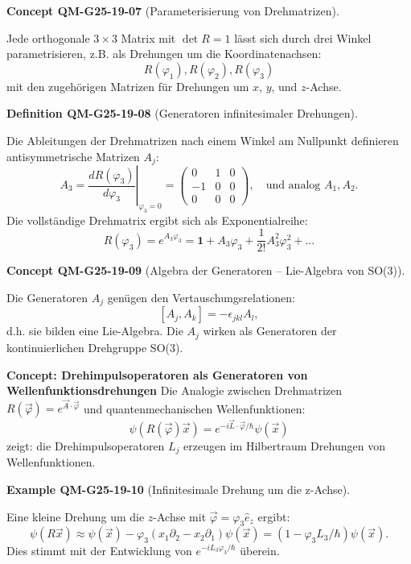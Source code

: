 \documentclass[10pt, letterpaper]{article}
\newcommand{\CustomHeading}[3]{%
  \par\medskip\noindent%
  \textbf{#1 #2} \textnormal{(#3)}.\enskip%
}
\newenvironment{DEF}[2]{\CustomHeading{Definition}{#1}{#2}}{}
\newenvironment{EXA}[2]{\CustomHeading{Example}{#1}{#2}}{}
\newenvironment{CONC}[2]{\CustomHeading{Concept}{#1}{#2}}{}
\begin{document}
\begin{CONC}{QM-G25-19-07}{Parameterisierung von Drehmatrizen}
Jede orthogonale $3\times3$ Matrix mit $\det R = 1$ lässt sich durch drei Winkel parametrisieren, z.B. als Drehungen um die Koordinatenachsen:
$$
R(\varphi_1), R(\varphi_2), R(\varphi_3)
$$
mit den zugehörigen Matrizen für Drehungen um $x$, $y$, und $z$-Achse.
\end{CONC}

\begin{DEF}{QM-G25-19-08}{Generatoren infinitesimaler Drehungen}
Die Ableitungen der Drehmatrizen nach einem Winkel am Nullpunkt definieren antisymmetrische Matrizen $A_j$:
$$
A_3 = \left.\frac{dR(\varphi_3)}{d\varphi_3}\right|_{\varphi_3=0} =
\begin{pmatrix}
0 & 1 & 0 \\
-1 & 0 & 0 \\
0 & 0 & 0
\end{pmatrix}, \quad \text{und analog } A_1, A_2.
$$
Die vollständige Drehmatrix ergibt sich als Exponentialreihe:
$$
R(\varphi_3) = e^{A_3 \varphi_3} = \mathbf{1} + A_3 \varphi_3 + \frac{1}{2!} A_3^2 \varphi_3^2 + \dots
$$
\end{DEF}

\begin{CONC}{QM-G25-19-09}{Algebra der Generatoren – Lie-Algebra von SO(3)}
Die Generatoren $A_j$ genügen den Vertauschungsrelationen:
$$
[A_j, A_k] = -\epsilon_{jkl} A_l,
$$
d.h. sie bilden eine Lie-Algebra. Die $A_j$ wirken als Generatoren der kontinuierlichen Drehgruppe SO(3).


\textbf{Concept: Drehimpulsoperatoren als Generatoren von Wellenfunktionsdrehungen}  
Die Analogie zwischen Drehmatrizen $R(\vec{\varphi}) = e^{\vec{A} \cdot \vec{\varphi}}$ und quantenmechanischen Wellenfunktionen:
$$
\psi(R(\vec{\varphi}) \vec{x}) = e^{-i \vec{L} \cdot \vec{\varphi} / \hbar} \psi(\vec{x})
$$
zeigt: die Drehimpulsoperatoren $L_j$ erzeugen im Hilbertraum Drehungen von Wellenfunktionen.
\end{CONC}

\begin{EXA}{QM-G25-19-10}{Infinitesimale Drehung um die z-Achse}
Eine kleine Drehung um die $z$-Achse mit $\vec{\varphi} = \varphi_3 \hat{e}_z$ ergibt:
$$
\psi(R \vec{x}) \approx \psi(\vec{x}) - \varphi_3 (x_1 \partial_2 - x_2 \partial_1) \psi(\vec{x}) = (1 - \varphi_3 L_3/\hbar) \psi(\vec{x}).
$$
Dies stimmt mit der Entwicklung von $e^{-i L_3 \varphi_3 / \hbar}$ überein.
\end{EXA}
\end{document}
